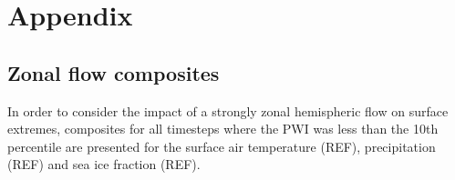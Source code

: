 \appendix
\section{Appendix}\label{s:appendix}

\subsection{Zonal flow composites}\label{s:zonal_composites}

In order to consider the impact of a strongly zonal hemispheric flow on surface extremes, composites for all timesteps where the PWI was less than the 10th percentile are presented for the surface air temperature (REF), precipitation (REF) and sea ice fraction (REF).